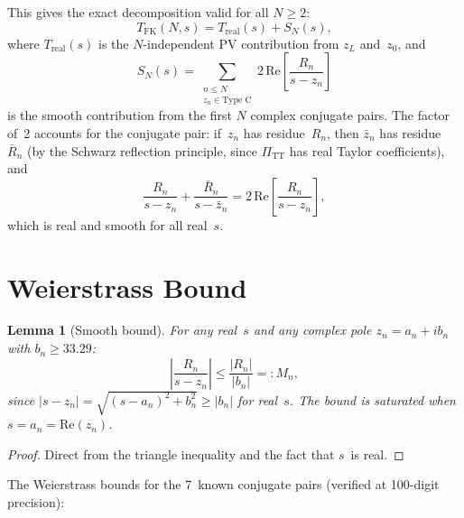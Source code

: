 \documentclass[11pt,a4paper]{article}
\newcommand{\PiTT}{\Pi_{\mathrm{TT}}}
\newcommand{\Real}{\mathrm{Re}}
\newtheorem{lemma}[theorem]{Lemma}
\begin{document}
This gives the exact decomposition valid for all $N \geq 2$:
\begin{equation}\label{eq:decomp}
  T_{\mathrm{FK}}(N,s) = T_{\mathrm{real}}(s) + S_N(s),
\end{equation}
where $T_{\mathrm{real}}(s)$ is the $N$-independent PV contribution from
$z_L$ and~$z_0$, and
\begin{equation}\label{eq:SN}
  S_N(s) = \sum_{\substack{n \leq N \\ z_n \in \text{Type~C}}}
  2\,\Real\!\left[\frac{R_n}{s - z_n}\right]
\end{equation}
is the smooth contribution from the first $N$ complex conjugate pairs.
The factor of~2 accounts for the conjugate pair: if~$z_n$ has
residue~$R_n$, then $\bar{z}_n$ has residue~$\bar{R}_n$ (by the Schwarz
reflection principle, since $\PiTT$ has real Taylor coefficients), and
\begin{equation}
  \frac{R_n}{s - z_n} + \frac{\bar{R}_n}{s - \bar{z}_n}
  = 2\,\Real\!\left[\frac{R_n}{s - z_n}\right],
\end{equation}
which is real and smooth for all real~$s$.


\section{Weierstrass Bound}
\label{sec:Mtest}

\begin{lemma}[Smooth bound]
\label{lem:bound}
For any real~$s$ and any complex pole $z_n = a_n + i b_n$ with
$b_n \geq 33.29$:
\begin{equation}\label{eq:bound}
  \left|\frac{R_n}{s - z_n}\right|
  \leq \frac{|R_n|}{|b_n|}
  =: M_n,
\end{equation}
since $|s - z_n| = \sqrt{(s-a_n)^2 + b_n^2} \geq |b_n|$ for real~$s$.
The bound is saturated when $s = a_n = \Real(z_n)$.
\end{lemma}

\begin{proof}
Direct from the triangle inequality and the fact that $s$~is real.
\end{proof}

The Weierstrass bounds for the 7~known conjugate pairs (verified at
100-digit precision):
\end{document}
